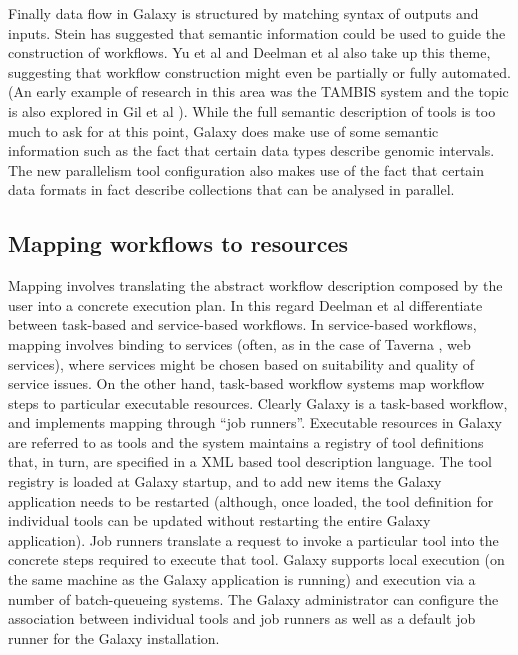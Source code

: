\documentclass[a4paper,10pt]{scrreprt}
\begin{document}
Finally data flow in Galaxy is structured by matching syntax of outputs and inputs. Stein \cite{stein_towards_2008} has suggested that semantic information could be used to guide the construction of workflows. Yu et al and Deelman et al also take up this theme, suggesting that workflow construction might even be partially or fully automated. (An early example of research in this area was the TAMBIS system \cite{stevens_tambis:_2000} and the topic is also explored in Gil et al \cite{gil_artificial_2004}). While the full semantic description of tools is too much to ask for at this point, Galaxy does make use of some semantic information such as the fact that certain data types describe genomic intervals. The new parallelism tool configuration also makes use of the fact that certain data formats in fact describe collections that can be analysed in parallel.

\subsection{Mapping workflows to resources}

Mapping involves translating the abstract workflow description composed by the user into a concrete execution plan. In this regard Deelman et al differentiate between task-based and service-based workflows. In service-based workflows, mapping involves binding to services (often, as in the case of Taverna \cite{hull_taverna:_2006}, web services), where services might be chosen based on suitability and quality of service issues. On the other hand, task-based workflow systems map workflow steps to particular executable resources. Clearly Galaxy is a task-based workflow, and implements mapping through ``job runners''. Executable resources in Galaxy are referred to as tools and the system maintains a registry of tool definitions that, in turn, are specified in a XML based tool description language. The tool registry is loaded at Galaxy startup, and to add new items the Galaxy application needs to be restarted (although, once loaded, the tool definition for individual tools can be updated without restarting the 
entire Galaxy application). Job runners translate a request to invoke a particular tool into the concrete steps required to execute that tool. Galaxy supports local execution (on the same machine as the Galaxy application is running) and execution via a number of batch-queueing systems. The Galaxy administrator can configure the association between individual tools and job runners as well as a default job runner for the Galaxy installation.
\end{document}
